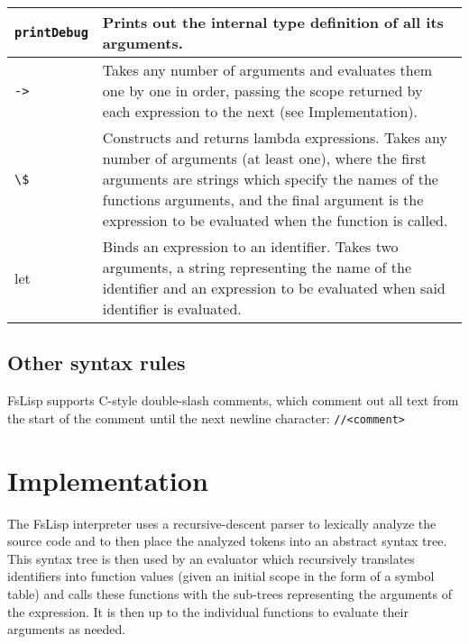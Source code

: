 \documentclass[11pt]{article}
\begin{document}
\begin{tabularx}{\textwidth} { | >{\raggedright\arraybackslash}p{3cm} | >{\raggedright\arraybackslash}X | }
            \hline
            \lstinline{printDebug} &
            Prints out the internal type definition of all its arguments.\\
            \hline
            \lstinline{->} &
            Takes any number of arguments and evaluates them one by one in order, passing the scope returned by each expression to the next
            (see Implementation). \\
            \hline
            \lstinline{\$} &
            Constructs and returns lambda expressions. Takes any number of arguments (at least one), where the first arguments are strings
            which specify the names of the functions arguments, and the final argument is the expression to be evaluated when the function is called.\\
            \hline
            let &
            Binds an expression to an identifier. Takes two arguments, a string representing the name of the identifier and an expression to be evaluated
            when said identifier is evaluated. \\
            \hline
        \end{tabularx}

    \subsection{Other syntax rules}
        FsLisp supports C-style double-slash comments, which comment out all text from the start of the comment until the next newline character:
        \lstinline{//<comment>}

\newpage

\section{Implementation}
The FsLisp interpreter uses a recursive-descent parser to lexically analyze the source code and to then place the analyzed tokens into an abstract syntax tree. This syntax tree is then used by an evaluator which recursively translates identifiers into function values (given an initial scope in the form of a symbol table) and calls these functions with the sub-trees representing the arguments of the expression. It is then up to the individual functions to evaluate their arguments as needed.
\end{document}
